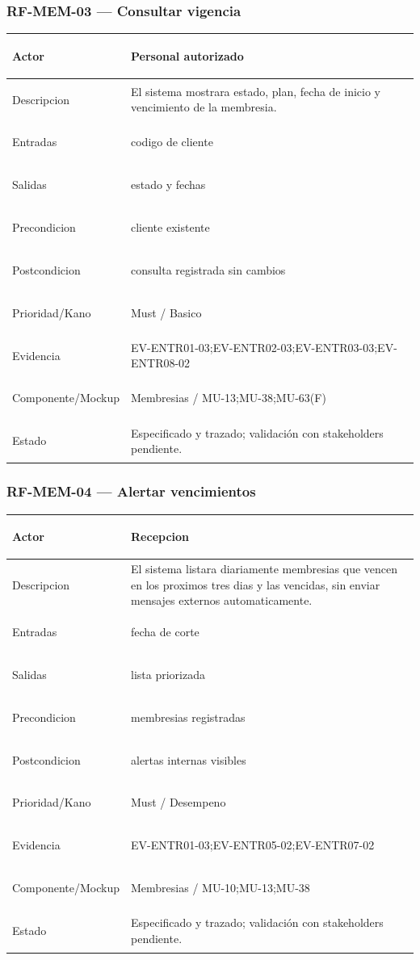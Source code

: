 \documentclass[11pt,a4paper,twoside]{article}
\begin{document}
\subsubsection{RF-MEM-03 — Consultar vigencia}
\begingroup
\renewcommand{\arraystretch}{1.12}
\setlength{\tabcolsep}{5pt}
\begin{tabularx}{\textwidth}{|>{\bfseries\raggedright\arraybackslash}p{3.35cm}|>{\raggedright\arraybackslash}X|}
\hline
Actor & Personal autorizado \\ \hline
Descripcion & El sistema mostrara estado, plan, fecha de inicio y vencimiento de la membresia. \\ \hline
Entradas & codigo de cliente \\ \hline
Salidas & estado y fechas \\ \hline
Precondicion & cliente existente \\ \hline
Postcondicion & consulta registrada sin cambios \\ \hline
Prioridad/Kano & Must / Basico \\ \hline
Evidencia & EV-ENTR01-03;EV-ENTR02-03;EV-ENTR03-03;EV-ENTR08-02 \\ \hline
Componente/Mockup & Membresias / MU-13;MU-38;MU-63(F) \\ \hline
Estado & Especificado y trazado; validación con stakeholders pendiente. \\ \hline
\end{tabularx}
\endgroup

\subsubsection{RF-MEM-04 — Alertar vencimientos}
\begingroup
\renewcommand{\arraystretch}{1.12}
\setlength{\tabcolsep}{5pt}
\begin{tabularx}{\textwidth}{|>{\bfseries\raggedright\arraybackslash}p{3.35cm}|>{\raggedright\arraybackslash}X|}
\hline
Actor & Recepcion \\ \hline
Descripcion & El sistema listara diariamente membresias que vencen en los proximos tres dias y las vencidas, sin enviar mensajes externos automaticamente. \\ \hline
Entradas & fecha de corte \\ \hline
Salidas & lista priorizada \\ \hline
Precondicion & membresias registradas \\ \hline
Postcondicion & alertas internas visibles \\ \hline
Prioridad/Kano & Must / Desempeno \\ \hline
Evidencia & EV-ENTR01-03;EV-ENTR05-02;EV-ENTR07-02 \\ \hline
Componente/Mockup & Membresias / MU-10;MU-13;MU-38 \\ \hline
Estado & Especificado y trazado; validación con stakeholders pendiente. \\ \hline
\end{tabularx}
\endgroup
\end{document}

